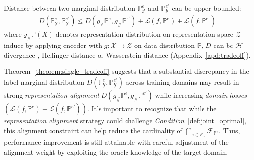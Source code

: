 \begin{theorem}
\label{theorem:single_tradeoff} \citep{zhao2019learning, phung2021learning, le2021lamda} Distance between two marginal distribution $\mathbb{P}^{e}_\mathcal{Y}$ and $\mathbb{P}^{e'}_\mathcal{Y}$ can be upper-bounded: 
\vspace{-1mm}
\begin{equation*}
\begin{aligned}
D\left(\mathbb{P}_{\mathcal{Y}}^{e},\mathbb{P}_{\mathcal{Y}}^{e'}\right) \leq 
D\left ( g_{\#}\mathbb{P}^{e},g_{\#}\mathbb{P}^{e'} \right )
+\mathcal{L}\left ( f,\mathbb{P}^{e} \right )
+
\mathcal{L}\left ( f,\mathbb{P}^{e'} \right )
\end{aligned}
\end{equation*}
where $g_{\#}\mathbb{P}(X)$ denotes representation distribution on  representation space $\mathcal{Z}$ induce by applying encoder with $g: \mathcal{X} \mapsto \mathcal{Z}$ on data distribution $\mathbb{P}$, $D$ can be $\mathcal{H}$-divergence \citep{zhao2019learning}, Hellinger distance \citep{phung2021learning} or Wasserstein distance \citep{le2021lamda} (Appendix~\ref{apd:tradeoff}).
\end{theorem}

Theorem~\ref{theorem:single_tradeoff} suggests that a substantial discrepancy in the label marginal distribution $D\left(\mathbb{P}_{\mathcal{Y}}^{e},\mathbb{P}_{\mathcal{Y}}^{e'}\right)$ across training domains may result in strong \textit{representation alignment} $D\left ( g_{\#}\mathbb{P}^{e},g_{\#}\mathbb{P}^{e'} \right )$ while increasing \textit{domain-losses} $\left ( \mathcal{L}\left ( f,\mathbb{P}^{e} \right ) + \mathcal{L}\left ( f,\mathbb{P}^{e'}\right )\right )$. It's important to recognize that while the \textit{representation alignment} strategy could challenge \textit{Condition}~\ref{def:joint_optimal}, this alignment constraint can help reduce the cardinality of $ \bigcap_{e\in \mathcal{E}_{tr}}\mathcal{F}_{ \mathbb{P}^e}$. Thus, performance improvement is still attainable with careful adjustment of the alignment weight by exploiting the oracle knowledge of the target domain.
\label{sec:representation_alignment}

